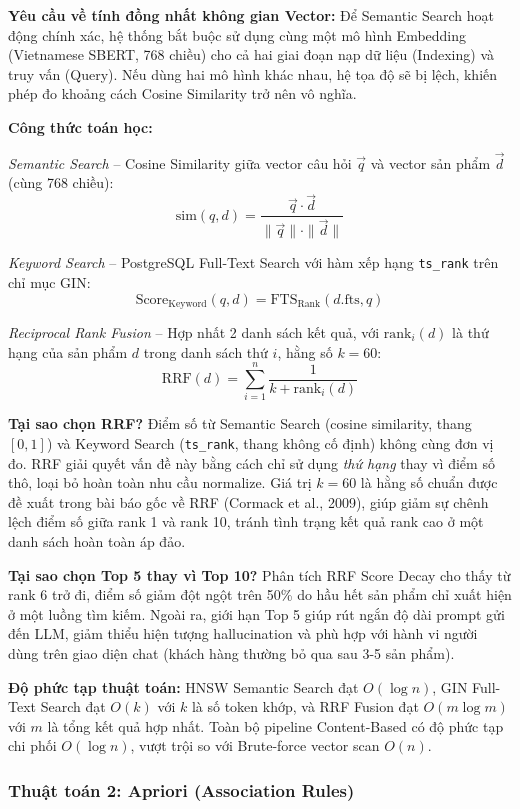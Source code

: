 \documentclass[12pt,a4paper]{report}
\begin{document}
\textbf{Yêu cầu về tính đồng nhất không gian Vector:} Để Semantic Search hoạt động chính xác, hệ thống bắt buộc sử dụng cùng một mô hình Embedding (Vietnamese SBERT, 768 chiều) cho cả hai giai đoạn nạp dữ liệu (Indexing) và truy vấn (Query). Nếu dùng hai mô hình khác nhau, hệ tọa độ sẽ bị lệch, khiến phép đo khoảng cách Cosine Similarity trở nên vô nghĩa.
 
\textbf{Công thức toán học:}
 
\textit{Semantic Search} -- Cosine Similarity giữa vector câu hỏi $\vec{q}$ và vector sản phẩm $\vec{d}$ (cùng 768 chiều):
\[
\text{sim}(q, d) = \frac{\vec{q} \cdot \vec{d}}{\|\vec{q}\| \cdot \|\vec{d}\|}
\]
 
\textit{Keyword Search} -- PostgreSQL Full-Text Search với hàm xếp hạng \texttt{ts\_rank} trên chỉ mục GIN:
\[
\text{Score}_{\text{Keyword}}(q, d) = \text{FTS}_{\text{Rank}}(d.\text{fts}, q)
\]
 
\textit{Reciprocal Rank Fusion} -- Hợp nhất 2 danh sách kết quả, với $\text{rank}_i(d)$ là thứ hạng của sản phẩm $d$ trong danh sách thứ $i$, hằng số $k = 60$:
\[
\text{RRF}(d) = \sum_{i=1}^{n} \frac{1}{k + \text{rank}_i(d)}
\]
 
\textbf{Tại sao chọn RRF?} Điểm số từ Semantic Search (cosine similarity, thang $[0, 1]$) và Keyword Search (\texttt{ts\_rank}, thang không cố định) không cùng đơn vị đo. RRF giải quyết vấn đề này bằng cách chỉ sử dụng \textit{thứ hạng} thay vì điểm số thô, loại bỏ hoàn toàn nhu cầu normalize. Giá trị $k = 60$ là hằng số chuẩn được đề xuất trong bài báo gốc về RRF (Cormack et al., 2009), giúp giảm sự chênh lệch điểm số giữa rank 1 và rank 10, tránh tình trạng kết quả rank cao ở một danh sách hoàn toàn áp đảo.
 
\textbf{Tại sao chọn Top 5 thay vì Top 10?} Phân tích RRF Score Decay cho thấy từ rank 6 trở đi, điểm số giảm đột ngột trên 50\% do hầu hết sản phẩm chỉ xuất hiện ở một luồng tìm kiếm. Ngoài ra, giới hạn Top 5 giúp rút ngắn độ dài prompt gửi đến LLM, giảm thiểu hiện tượng hallucination và phù hợp với hành vi người dùng trên giao diện chat (khách hàng thường bỏ qua sau 3-5 sản phẩm).
 
\textbf{Độ phức tạp thuật toán:} HNSW Semantic Search đạt $O(\log n)$, GIN Full-Text Search đạt $O(k)$ với $k$ là số token khớp, và RRF Fusion đạt $O(m \log m)$ với $m$ là tổng kết quả hợp nhất. Toàn bộ pipeline Content-Based có độ phức tạp chi phối $O(\log n)$, vượt trội so với Brute-force vector scan $O(n)$.
 
\subsubsection{Thuật toán 2: Apriori (Association Rules)}
 
\end{document}
